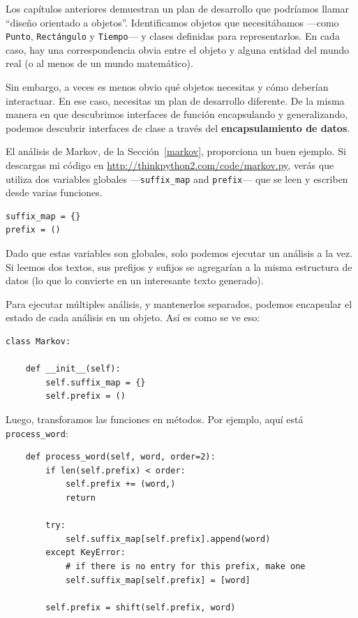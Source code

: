 \documentclass[10pt]{book}
\begin{document}
Los capítulos anteriores demuestran un plan de desarrollo que podríamos llamar
``diseño orientado a objetos''.  Identificamos objetos que necesitábamos ---como
{\tt Punto}, {\tt Rectángulo} y {\tt Tiempo}--- y clases definidas para
representarlos.  En cada caso, hay una correspondencia obvia
entre el objeto y alguna entidad del mundo real (o al menos de un
mundo matemático).

Sin embargo, a veces es menos obvio qué objetos necesitas
y cómo deberían interactuar.  En ese caso, necesitas un plan de desarrollo
diferente.  De la misma manera en que descubrimos interfaces
de función encapsulando y generalizando, podemos descubrir
interfaces de clase a través del {\bf encapsulamiento de datos}.

El análisis de Markov, de la Sección~\ref{markov}, proporciona un buen ejemplo.
Si descargas mi código en \url{http://thinkpython2.com/code/markov.py},
verás que utiliza dos variables globales ---\verb"suffix_map" and
\verb"prefix"--- que se leen y escriben desde varias funciones.

\begin{verbatim}
suffix_map = {}
prefix = ()
\end{verbatim}

Dado que estas variables son globales, solo podemos ejecutar un análisis a la
vez.  Si leemos dos textos, sus prefijos y sufijos se
agregarían a la misma estructura de datos (lo que lo convierte en un interesante
texto generado).

Para ejecutar múltiples análisis, y mantenerlos separados, podemos encapsular
el estado de cada análisis en un objeto.
Así es como se ve eso:

\begin{verbatim}
class Markov:

    def __init__(self):
        self.suffix_map = {}
        self.prefix = ()
\end{verbatim}

Luego, transforamos las funciones en métodos.  Por ejemplo,
aquí está \verb"process_word":

\begin{verbatim}
    def process_word(self, word, order=2):
        if len(self.prefix) < order:
            self.prefix += (word,)
            return

        try:
            self.suffix_map[self.prefix].append(word)
        except KeyError:
            # if there is no entry for this prefix, make one
            self.suffix_map[self.prefix] = [word]

        self.prefix = shift(self.prefix, word)
\end{verbatim}
\end{document}
